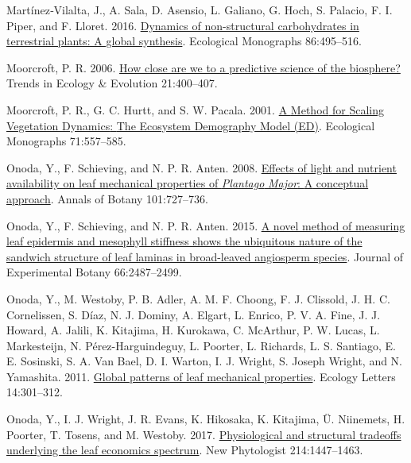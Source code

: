 \documentclass[
  12pt,
  letterpaper,
  DIV=11,
  numbers=noendperiod]{scrartcl}
\newlength{\cslhangindent}
\newlength{\cslentryspacingunit} %
\newenvironment{CSLReferences}[2] %
 {%
  \setlength{\parindent}{0pt}
  \ifodd #1
  \let\oldpar\par
  \def\par{\hangindent=\cslhangindent\oldpar}
  \fi
  \setlength{\parskip}{#2\cslentryspacingunit}
 }%
 {}
\begin{document}
\begin{CSLReferences}{1}{0}
\leavevmode{}%
Martínez‐Vilalta, J., A. Sala, D. Asensio, L. Galiano, G. Hoch, S.
Palacio, F. I. Piper, and F. Lloret. 2016.
\href{https://doi.org/10.1002/ecm.1231}{Dynamics of non-structural
carbohydrates in terrestrial plants: A global synthesis}. Ecological
Monographs 86:495--516.

\leavevmode{}%
Moorcroft, P. R. 2006.
\href{https://doi.org/10.1016/j.tree.2006.04.009}{How close are we to a
predictive science of the biosphere?} Trends in Ecology \& Evolution
21:400--407.

\leavevmode{}%
Moorcroft, P. R., G. C. Hurtt, and S. W. Pacala. 2001.
\href{https://doi.org/10.2307/3100036}{A {Method} for {Scaling
Vegetation Dynamics}: {The Ecosystem Demography Model} ({ED})}.
Ecological Monographs 71:557--585.

\leavevmode{}%
Onoda, Y., F. Schieving, and N. P. R. Anten. 2008.
\href{https://doi.org/10.1093/aob/mcn013}{Effects of light and nutrient
availability on leaf mechanical properties of {\emph{Plantago}}{
\emph{Major}}: {A} conceptual approach}. Annals of Botany 101:727--736.

\leavevmode{}%
Onoda, Y., F. Schieving, and N. P. R. Anten. 2015.
\href{https://doi.org/10.1093/jxb/erv024}{A novel method of measuring
leaf epidermis and mesophyll stiffness shows the ubiquitous nature of
the sandwich structure of leaf laminas in broad-leaved angiosperm
species}. Journal of Experimental Botany 66:2487--2499.

\leavevmode{}%
Onoda, Y., M. Westoby, P. B. Adler, A. M. F. Choong, F. J. Clissold, J.
H. C. Cornelissen, S. Díaz, N. J. Dominy, A. Elgart, L. Enrico, P. V. A.
Fine, J. J. Howard, A. Jalili, K. Kitajima, H. Kurokawa, C. McArthur, P.
W. Lucas, L. Markesteijn, N. Pérez-Harguindeguy, L. Poorter, L.
Richards, L. S. Santiago, E. E. Sosinski, S. A. Van Bael, D. I. Warton,
I. J. Wright, S. Joseph Wright, and N. Yamashita. 2011.
\href{https://doi.org/10.1111/j.1461-0248.2010.01582.x}{Global patterns
of leaf mechanical properties}. Ecology Letters 14:301--312.

\leavevmode{}%
Onoda, Y., I. J. Wright, J. R. Evans, K. Hikosaka, K. Kitajima, Ü.
Niinemets, H. Poorter, T. Tosens, and M. Westoby. 2017.
\href{https://doi.org/10.1111/nph.14496}{Physiological and structural
tradeoffs underlying the leaf economics spectrum}. New Phytologist
214:1447--1463.


\end{CSLReferences}
\end{document}
